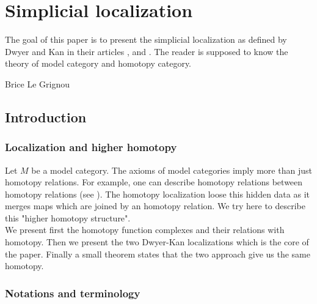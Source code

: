 \chapter{Simplicial localization}

\begin{refsection}

The goal of this paper is to present the simplicial localization as defined by Dwyer and Kan in their articles \cite{dksimplicial}, \cite{dkcomputing} and \cite{dkfunction}. The reader is supposed to know the theory of model category and homotopy category.

\begin{flushright}
Brice Le Grignou
\end{flushright}

\section{Introduction}

\subsection{Localization and higher homotopy}

Let $M$ be a model category. The axioms of model categories imply more than just homotopy relations. For example, one can describe homotopy relations between homotopy relations (see \cite[2.3]{fromHAtoHAG}). The homotopy localization loose this hidden data as it merges maps which are joined by an homotopy relation. We try here to describe this "higher homotopy structure".\\

We present first the homotopy function complexes and their relations with homotopy. Then we present the two Dwyer-Kan localizations which is the core of the paper. Finally a small theorem states that the two approach give us the same homotopy.

\subsection{Notations and terminology}


\end{refsection}
